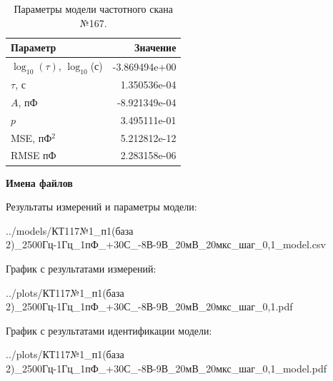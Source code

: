 \begin{table}[!ht]
    \centering
    \caption{Параметры модели частотного скана №167.}
    \begin{tabular}{|l|r|}
        \hline
        Параметр                                       & Значение                  \\ \hline
        $\log_{10}(\tau)$, $\log_{10}$(с)              & -3.869494e+00             \\ \hline
        $\tau$, с                                      & 1.350536e-04              \\ \hline
        $A$, пФ                                        & -8.921349e-04             \\ \hline
        $p$                                            & 3.495111e-01              \\ \hline
        MSE, пФ$^2$                                    & 5.212812e-12              \\ \hline
        RMSE пФ                                        & 2.283158e-06              \\ \hline
    \end{tabular}
    \label{table:frequency_scan_model_167}
\end{table}

\textbf{Имена файлов}

Результаты измерений и параметры модели:

\scriptsize../models/КТ117№1\_п1(база 2)\_2500Гц-1Гц\_1пФ\_+30С\_-8В-9В\_20мВ\_20мкс\_шаг\_0,1\_model.csv
\normalsize

График с результатами измерений:

\scriptsize../plots/КТ117№1\_п1(база 2)\_2500Гц-1Гц\_1пФ\_+30С\_-8В-9В\_20мВ\_20мкс\_шаг\_0,1.pdf
\normalsize

График с результатами идентификации модели:

\scriptsize../plots/КТ117№1\_п1(база 2)\_2500Гц-1Гц\_1пФ\_+30С\_-8В-9В\_20мВ\_20мкс\_шаг\_0,1\_model.pdf
\normalsize


